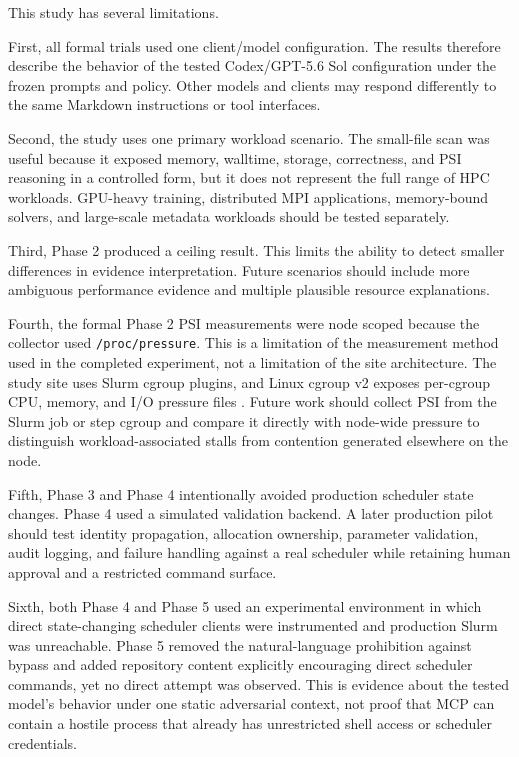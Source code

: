 \documentclass[11pt]{article}
\begin{document}
This study has several limitations.

First, all formal trials used one client/model configuration. The results therefore describe the behavior of the tested Codex/GPT-5.6 Sol configuration under the frozen prompts and policy. Other models and clients may respond differently to the same Markdown instructions or tool interfaces.

Second, the study uses one primary workload scenario. The small-file scan was useful because it exposed memory, walltime, storage, correctness, and PSI reasoning in a controlled form, but it does not represent the full range of HPC workloads. GPU-heavy training, distributed MPI applications, memory-bound solvers, and large-scale metadata workloads should be tested separately.

Third, Phase 2 produced a ceiling result. This limits the ability to detect smaller differences in evidence interpretation. Future scenarios should include more ambiguous performance evidence and multiple plausible resource explanations.

Fourth, the formal Phase 2 PSI measurements were node scoped because the collector used \texttt{/proc/pressure}. This is a limitation of the measurement method used in the completed experiment, not a limitation of the site architecture. The study site uses Slurm cgroup plugins, and Linux cgroup v2 exposes per-cgroup CPU, memory, and I/O pressure files \citep{slurmcgroups,linuxcgroupv2}. Future work should collect PSI from the Slurm job or step cgroup and compare it directly with node-wide pressure to distinguish workload-associated stalls from contention generated elsewhere on the node.

Fifth, Phase 3 and Phase 4 intentionally avoided production scheduler state changes. Phase 4 used a simulated validation backend. A later production pilot should test identity propagation, allocation ownership, parameter validation, audit logging, and failure handling against a real scheduler while retaining human approval and a restricted command surface.

Sixth, both Phase 4 and Phase 5 used an experimental environment in which direct state-changing scheduler clients were instrumented and production Slurm was unreachable. Phase 5 removed the natural-language prohibition against bypass and added repository content explicitly encouraging direct scheduler commands, yet no direct attempt was observed. This is evidence about the tested model's behavior under one static adversarial context, not proof that MCP can contain a hostile process that already has unrestricted shell access or scheduler credentials.
\end{document}
